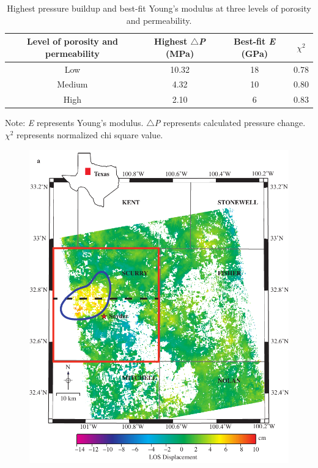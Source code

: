 \clearpage
\begin{table}[h!]
	\begin{center}
		\begin{threeparttable}
		\caption{Highest pressure buildup and best-fit Young's modulus at three levels of porosity and permeability.}
		\label{tab:table3}
		\begin{tabular}{cccc}
			\midrule
			Level of porosity and permeability & Highest $\triangle$\textit{P} (MPa) & Best-fit \textit{E} (GPa) & $\chi$$^{2}$\\
			\midrule
			Low & 10.32 & 18 & 0.78\\
			Medium & 4.32 & 10 & 0.80\\
			High & 2.10 & 6 & 0.83\\
			\midrule						
		\end{tabular}
		\begin{tablenotes}
			\small
			\item Note: \textit{E} represents Young's modulus. $\triangle$\textit{P} represents calculated pressure change. $\chi$$^{2}$ represents normalized chi square value.
		\end{tablenotes}
		\end{threeparttable}
	\end{center}
\end{table}

\clearpage
\begin{figure}
\centering
\includegraphics{figs_paper3/Fig1a.pdf}
\label{fig:chpt5_fig1a}
\end{figure}

